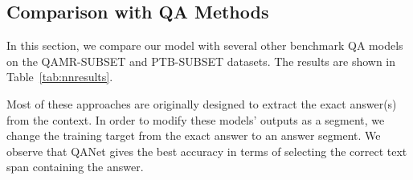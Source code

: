 \subsection{Comparison with QA Methods}
In this section, we compare our model with several other benchmark QA models on the QAMR-SUBSET and PTB-SUBSET datasets. The results are shown in Table~\ref{tab:nnresults}. 
\begin{table}[h]
\caption{\fontsize{10}{12}\selectfont  Our model vs. popular QA models.}\label{tab:nnresults}
  \vspace{-2ex}
\end{table}
Most of these approaches are originally designed to extract the exact answer(s) from the context. In order to modify these models' outputs as a segment, we change the training target from the exact answer to an answer segment. We observe that QANet gives the best accuracy in terms of selecting the correct text span containing the answer. 




